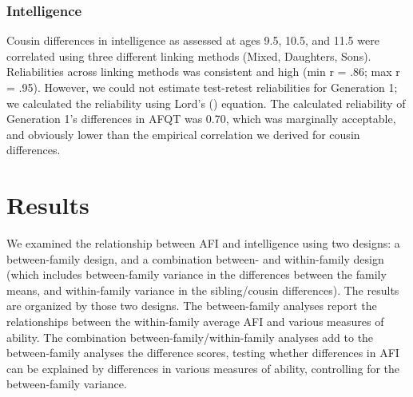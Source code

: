 \documentclass[a4paper,man,apacite,natbib,12pt,longtable]{apa6}\usepackage[]{graphicx}\usepackage[]{color}
\begin{document}
\subsubsection{Intelligence} Cousin differences in intelligence as assessed at ages 9.5, 10.5, and 11.5 were correlated using three different linking methods (Mixed, Daughters, Sons). Reliabilities across linking methods was consistent and high (min r = .86; max r = .95). However, we could not estimate test-retest reliabilities for Generation 1; we calculated the reliability using Lord's (\citeyear{Lord1963}) equation. The calculated reliability of Generation 1's differences in AFQT was 0.70, which was marginally acceptable, and obviously lower than the empirical correlation we derived for cousin differences.%
\section{Results}
We examined the relationship between AFI and intelligence using two designs: a between-family design, and a combination between- and within-family design (which includes between-family variance in the differences between the family means, and within-family variance in the sibling/cousin differences). The results are organized by those two designs. The between-family analyses report the relationships between the within-family average AFI and various measures of ability. The combination between-family/within-family analyses add to the between-family analyses the difference scores, testing whether differences in AFI can be explained by differences in various measures of ability, controlling for the between-family variance.
%
\end{document}
